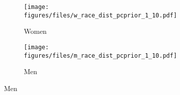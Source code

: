\begin{figure}[htp]
\caption{Posterior Distribution $exp(\beta_{\text{Mob}})$ and $exp(\beta_{\text{Gini}})$ (Equation \ref{eq:model_age}) \newline by Race/Ethnicity and Gender}
\centering

  \begin{subfigure}[b]{.80\linewidth}
    \centering
       \caption{Women}
    \texttt{[image: figures/files/w\_race\_dist\_pcprior\_1\_10.pdf]}
  \end{subfigure}%

 \begin{subfigure}[b]{.80\linewidth}
   \caption{Men}
    \centering
    \texttt{[image: figures/files/m\_race\_dist\_pcprior\_1\_10.pdf]}
  \end{subfigure}%
  \label{fig:race}
\end{figure}